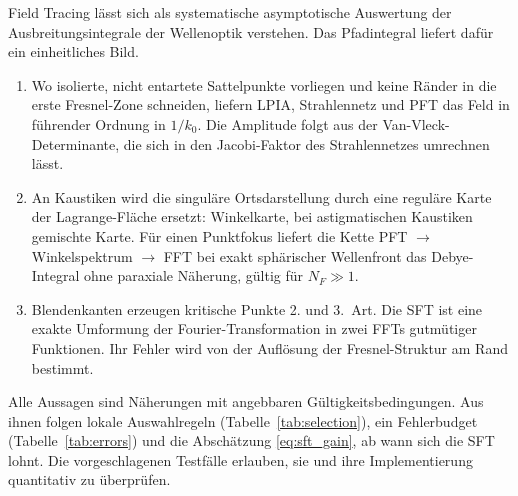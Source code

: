 \documentclass[11pt,a4paper]{scrartcl}
\theoremstyle{insightstyle}
\begin{document}
Field Tracing lässt sich als systematische asymptotische Auswertung der Ausbreitungsintegrale der Wellenoptik verstehen. Das Pfadintegral liefert dafür ein einheitliches Bild.
\begin{enumerate}
    \item Wo isolierte, nicht entartete Sattelpunkte vorliegen und keine Ränder in die erste Fresnel-Zone schneiden, liefern LPIA, Strahlennetz und PFT das Feld in führender Ordnung in $1/k_0$. Die Amplitude folgt aus der Van-Vleck-Determinante, die sich in den Jacobi-Faktor des Strahlennetzes umrechnen lässt.
    \item An Kaustiken wird die singuläre Ortsdarstellung durch eine reguläre Karte der Lagrange-Fläche ersetzt: Winkelkarte, bei astigmatischen Kaustiken gemischte Karte. Für einen Punktfokus liefert die Kette PFT $\to$ Winkelspektrum $\to$ FFT bei exakt sphärischer Wellenfront das Debye-Integral ohne paraxiale Näherung, gültig für $N_F\gg1$.
    \item Blendenkanten erzeugen kritische Punkte 2. und 3.~Art. Die SFT ist eine exakte Umformung der Fourier-Transformation in zwei FFTs gutmütiger Funktionen. Ihr Fehler wird von der Auflösung der Fresnel-Struktur am Rand bestimmt.
\end{enumerate}
Alle Aussagen sind Näherungen mit angebbaren Gültigkeitsbedingungen. Aus ihnen folgen lokale Auswahlregeln (Tabelle~\ref{tab:selection}), ein Fehlerbudget (Tabelle~\ref{tab:errors}) und die Abschätzung \eqref{eq:sft_gain}, ab wann sich die SFT lohnt. Die vorgeschlagenen Testfälle erlauben, sie und ihre Implementierung quantitativ zu überprüfen.
\end{document}
